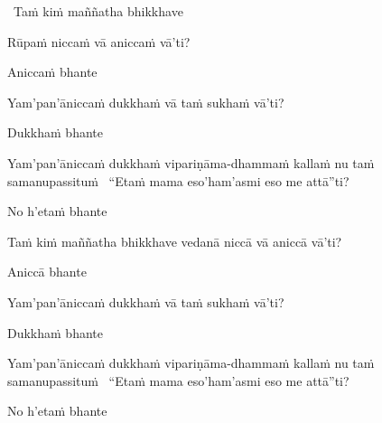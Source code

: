 \begin{leader-pali}
  \anglebracketleft\ \hspace{-0.5mm}Taṁ kiṁ maññatha bhikkhave \hspace{-0.5mm}\anglebracketright\
\end{leader-pali}
\begin{pali-hang-together}
  Rūpaṁ niccaṁ vā aniccaṁ vā'ti?
\end{pali-hang-together}
\begin{pali-hang-together}
  Aniccaṁ bhante
\end{pali-hang-together}
\begin{pali-hang-together}
  Yam'pan'āniccaṁ dukkhaṁ vā taṁ sukhaṁ vā'ti?
\end{pali-hang-together}
\begin{pali-hang-together}
  Dukkhaṁ bhante
\end{pali-hang-together}
\begin{pali-hang-together}
  Yam'pan'āniccaṁ dukkhaṁ vipariṇāma-dhammaṁ kallaṁ nu taṁ samanupassituṁ \breathmark\ ``Etaṁ mama eso'ham'asmi eso me attā''ti?
\end{pali-hang-together}
\begin{pali-hang-together}
  No h'etaṁ bhante
\end{pali-hang-together}

\begin{pali-hang}
  Taṁ kiṁ maññatha bhikkhave vedanā niccā vā aniccā vā'ti?
\end{pali-hang}
\begin{pali-hang-together}
  Aniccā bhante
\end{pali-hang-together}
\begin{pali-hang-together}
  Yam'pan'āniccaṁ dukkhaṁ vā taṁ sukhaṁ vā'ti?
\end{pali-hang-together}
\begin{pali-hang-together}
  Dukkhaṁ bhante
\end{pali-hang-together}
\ifafive\clearpage\fi
\begin{pali-hang-together}
  Yam'pan'āniccaṁ dukkhaṁ vipariṇāma-dhammaṁ kallaṁ nu taṁ samanupassituṁ \breathmark\ ``Etaṁ mama eso'ham'asmi eso me attā''ti?
\end{pali-hang-together}
\begin{pali-hang-together}
  No h'etaṁ bhante
\end{pali-hang-together}

